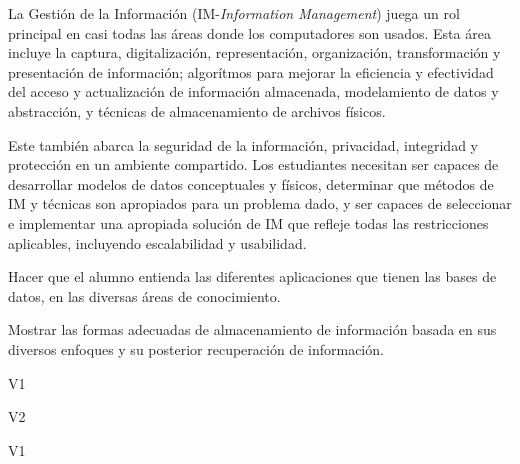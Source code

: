 \begin{syllabus}


\begin{justification}
La Gestión de la Información (IM-\textit{Information Management}) juega un rol principal en casi todas las áreas donde los computadores son usados. Esta área incluye la captura, digitalización, representación, organización, transformación y presentación de información; algorítmos para mejorar la eficiencia y efectividad del acceso y actualización de información almacenada, modelamiento de datos y abstracción, y técnicas de almacenamiento de archivos físicos.

Este también abarca la seguridad de la información, privacidad, integridad y protección en un ambiente compartido. Los estudiantes necesitan ser capaces de desarrollar modelos de datos conceptuales y físicos, determinar que métodos de IM y técnicas son apropiados para un problema dado, y ser capaces de seleccionar e implementar una apropiada solución de IM que refleje todas las restricciones aplicables, incluyendo escalabilidad y usabilidad.
\end{justification}

\begin{goals}
\item Hacer que el alumno entienda las diferentes aplicaciones que tienen las bases de datos, en las diversas áreas de conocimiento.
\item Mostrar las formas adecuadas de almacenamiento de información basada en sus diversos enfoques y su posterior recuperación de información.
\end{goals}

\begin{outcomes}{V1}
    \item {}
    \item {}
    \item {}
\end{outcomes}

\begin{outcomes}{V2}
    \item {}
    \item {}
\end{outcomes}

\begin{competences}{V1}
    \item {} 
    \item {}
    \item {}
\end{competences}


\end{syllabus}
